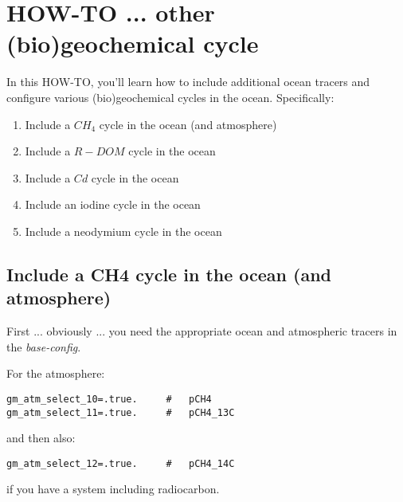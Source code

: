 
\newpage


\section{HOW-TO ...  other (bio)geochemical cycle}

In this HOW-TO, you'll learn how to include additional ocean tracers and configure various (bio)geochemical cycles in the ocean. Specifically:

\vspace{1mm}
\begin{enumerate}[noitemsep]
\vspace{1mm}
\item Include a \(CH_{4}\) cycle in the ocean (and atmosphere)
\vspace{1mm}
\item Include a \(R-DOM\) cycle in the ocean
\vspace{1mm}
\item Include a \(Cd\) cycle in the ocean
\vspace{1mm}
\item Include an iodine cycle in the ocean
\vspace{1mm}
\item Include a neodymium cycle in the ocean
\end{enumerate}

%
\newpage
%
\subsection*{Include a CH4 cycle in the ocean (and atmosphere)}
\vspace{1mm}

First ... obviously ... you need the appropriate ocean and atmospheric tracers in the \textit{base-config}.

\vspace{1mm}
\noindent For the atmosphere:
\small\vspace{-2pt}\begin{verbatim}
gm_atm_select_10=.true.     #   pCH4
gm_atm_select_11=.true.     #   pCH4_13C
\end{verbatim}\vspace{-2pt}\normalsize
and then also:
\small\vspace{-2pt}\begin{verbatim}
gm_atm_select_12=.true.     #   pCH4_14C
\end{verbatim}\vspace{-2pt}\normalsize
if you have a system including radiocarbon.

